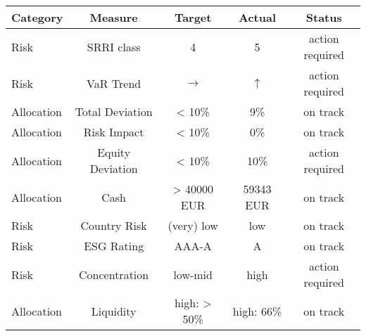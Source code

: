 \center
\begin{tabular}{l|c|c|c|c}
Category & Measure & Target & Actual & Status \\\hline\hline
Risk & SRRI class & 4 & 5 & \colorbox{octariskorange}{action required} \\\hline
Risk & VaR Trend & $\rightarrow$ & $\uparrow$ & \colorbox{octariskorange}{action required} \\\hline
Allocation & Total Deviation & < 10\% &   9\% & \colorbox{octariskgreen}{on track} \\\hline
Allocation & Risk Impact & < 10\% &   0\% & \colorbox{octariskgreen}{on track} \\\hline
Allocation & Equity Deviation & < 10\% &  10\% & \colorbox{octariskorange}{action required} \\\hline
Allocation & Cash & >    40000 EUR &     59343 EUR & \colorbox{octariskgreen}{on track} \\\hline
Risk & Country Risk & (very) low & low & \colorbox{octariskgreen}{on track} \\\hline
Risk & ESG Rating & AAA-A & A & \colorbox{octariskgreen}{on track} \\\hline
Risk & Concentration & low-mid & high & \colorbox{octariskorange}{action required} \\\hline
Allocation & Liquidity & high: > 50\%& high:  66\%& \colorbox{octariskgreen}{on track} \\\hline
\end{tabular}
